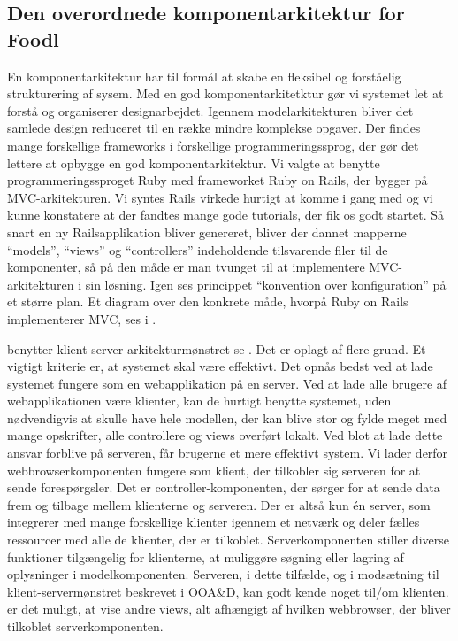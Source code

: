 \subsection{Den overordnede komponentarkitektur for Foodl}
\label{sec:overordnetkomponent}
En komponentarkitektur har til formål at skabe en fleksibel og forståelig strukturering af sysem. Med en god komponentarkitetktur gør vi systemet let at forstå og organiserer designarbejdet. Igennem modelarkitekturen bliver det samlede design reduceret til en række mindre komplekse opgaver\cite[s.~185]{ooad}. Der findes mange forskellige frameworks i forskellige programmeringssprog, der gør det lettere at opbygge en god komponentarkitektur. Vi valgte at benytte programmeringssproget Ruby med frameworket Ruby on Rails, der bygger på MVC-arkitekturen. Vi syntes Rails virkede hurtigt at komme i gang med og vi kunne konstatere at der fandtes mange gode tutorials, der fik os godt startet. Så snart en ny Railsapplikation bliver genereret, bliver der dannet mapperne ``models'', ``views'' og ``controllers'' indeholdende tilsvarende filer til de komponenter, så på den måde er man tvunget til at implementere MVC-arkitekturen i sin løsning. Igen ses princippet ``konvention over konfiguration'' på et større plan. Et diagram over den konkrete måde, hvorpå Ruby on Rails implementerer MVC, ses i .

\Foodl{} benytter klient-server arkitekturmønstret se . Det er oplagt af flere grund. Et vigtigt kriterie er, at systemet skal være effektivt. Det opnås bedst ved at lade systemet fungere som en webapplikation på en server. Ved at lade alle brugere af webapplikationen være klienter, kan de hurtigt benytte systemet, uden nødvendigvis at skulle have hele modellen, der kan blive stor og fylde meget med mange opskrifter, alle controllere og views overført lokalt. Ved blot at lade dette ansvar forblive på serveren, får brugerne et mere effektivt system. Vi lader derfor webbrowserkomponenten fungere som klient, der tilkobler sig serveren for at sende forespørgsler. Det er controller-komponenten, der sørger for at sende data frem og tilbage mellem klienterne og serveren. Der er altså kun én server, som integrerer med mange forskellige klienter igennem et netværk og deler fælles ressourcer med alle de klienter, der er tilkoblet. Serverkomponenten stiller diverse funktioner tilgængelig for klienterne, \fx at muliggøre søgning eller lagring af oplysninger i modelkomponenten. Serveren, i dette tilfælde, og i modsætning til klient-servermønstret beskrevet i OOA\&D\cite{ooad}, kan godt kende noget til/om klienten. \Fx er det muligt, at vise andre views, alt afhængigt af hvilken webbrowser, der bliver tilkoblet serverkomponenten.


